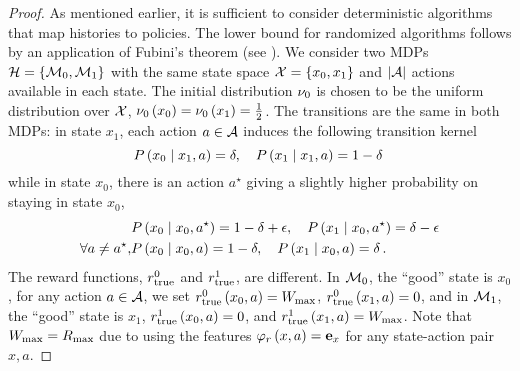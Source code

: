 \begin{proof}
    As mentioned earlier, it is sufficient to consider deterministic algorithms that map histories to policies. The lower bound for randomized algorithms follows by an application of Fubini's theorem (see \citealp{bubeck2012regret}). We consider two MDPs $\mathcal{H} = \left\{ \mathcal{M}_0, \mathcal{M}_1 \right\}$ with the same state space $\mathcal{X} = \left\{ x_0, x_1 \right\}$ and $\left|\mathcal{A}\right|$ actions available in each state. The initial distribution $\nu_0$ is chosen to be the uniform distribution over $\mathcal{X}$, \ie $\nu_0 \left( x_0 \right) = \nu_0 \left( x_1 \right) = \frac12$. The transitions are the same in both MDPs: in state $x_1$, each action $a \in \mathcal{A}$ induces the following transition kernel
    \begin{equation*}
        P \left( x_0 \mathrel{}\middle|\mathrel{} x_1, a \right) = \delta, \quad P \left( x_1 \mathrel{}\middle|\mathrel{} x_1, a \right) = 1 - \delta\,
    \end{equation*}
    while in state $x_0$, there is an action $a^\star$ giving a slightly higher probability on staying in state $x_0$, \ie
    \begin{align*}
        &P \left( x_0 \mathrel{}\middle|\mathrel{} x_0, a^\star \right) = 1 - \delta + \epsilon, \quad P \left( x_1 \mathrel{}\middle|\mathrel{} x_0, a^\star \right) = \delta - \epsilon \\
        \forall a \neq a^\star, &P \left( x_0 \mathrel{}\middle|\mathrel{} x_0, a \right) = 1 - \delta, \quad P \left( x_1 \mathrel{}\middle|\mathrel{} x_0, a \right) = \delta\,.
    \end{align*}
    The reward functions, $r_{\textup{true}}^0$ and $r_{\textup{true}}^1$, are different. In $\mathcal{M}_0$, the ``good'' state is $x_0$, \ie for any action $a \in \mathcal{A}$, we set $r_{\textup{true}}^0 \left( x_0, a \right) = W_{\max}$, $r_{\textup{true}}^0 \left( x_1, a \right) = 0$, and in $\mathcal{M}_1$, the ``good'' state is $x_1$, \ie $r_{\textup{true}}^1 \left( x_0, a \right) = 0$, and $r_{\textup{true}}^1 \left( x_1, a \right) = W_{\max}$. Note that $W_{\max} = R_{\max}$ due to using the features $\varphi_r \left( x, a \right) = \mathbf{e}_x$ for any state-action pair $x, a$.
     

\end{proof}
